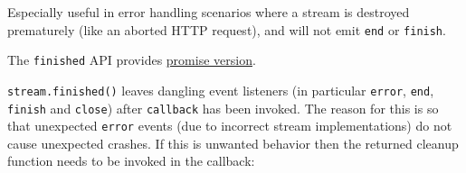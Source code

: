 \begin{Shaded}
\begin{Highlighting}[]
\OperatorTok{=} \NormalTok{(}\NormalTok{)}\OperatorTok{;}
\OperatorTok{=} \NormalTok{(}\NormalTok{)}\OperatorTok{;}

\OperatorTok{=}\NormalTok{(}\NormalTok{)}\OperatorTok{;}

\OperatorTok{,}\KeywordTok{=\textgreater{}}\NormalTok{ \{}
    \NormalTok{(}\OperatorTok{,}\OperatorTok{;}
\NormalTok{  \} }\NormalTok{ \{}
    \NormalTok{(}\NormalTok{)}\OperatorTok{;}
\NormalTok{  \}}
\NormalTok{\})}\OperatorTok{;}

\NormalTok{()}\OperatorTok{;} 
\end{Highlighting}
\end{Shaded}

Especially useful in error handling scenarios where a stream is
destroyed prematurely (like an aborted HTTP request), and will not emit
\texttt{\textquotesingle{}end\textquotesingle{}} or
\texttt{\textquotesingle{}finish\textquotesingle{}}.

The \texttt{finished} API provides
\hyperref[streamfinishedstream-options]{promise version}.

\texttt{stream.finished()} leaves dangling event listeners (in
particular \texttt{\textquotesingle{}error\textquotesingle{}},
\texttt{\textquotesingle{}end\textquotesingle{}},
\texttt{\textquotesingle{}finish\textquotesingle{}} and
\texttt{\textquotesingle{}close\textquotesingle{}}) after
\texttt{callback} has been invoked. The reason for this is so that
unexpected \texttt{\textquotesingle{}error\textquotesingle{}} events
(due to incorrect stream implementations) do not cause unexpected
crashes. If this is unwanted behavior then the returned cleanup function
needs to be invoked in the callback:

